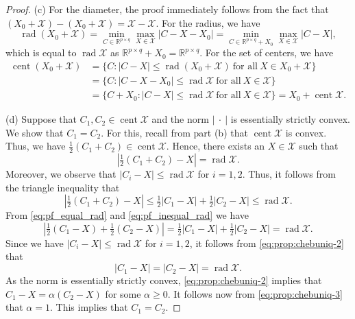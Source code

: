 \documentclass[pdflatex,sn-mathphys-num]{sn-jnl}%
\DeclareMathOperator{\rad}{rad}
\DeclareMathOperator{\cent}{cent}
\newcommand{\norm}[1]{\left|#1\right|}
\theoremstyle{thmstyleone}
\begin{document}
\begin{proof}
(c) For the diameter, the proof immediately follows from the fact that \mbox{$(X_0+\mathcal{X})-(X_0+\mathcal{X})=\mathcal{X}-\mathcal{X}$}. For the radius, we have
\begin{equation}
\rad (X_0+\mathcal{X})= \min_{C\in\mathbb{R}^{p\times q}} \max_{X\in\mathcal{X}} \norm{C-X-X_0}=\min_{C\in\mathbb{R}^{p\times q}+X_0} \max_{X\in\mathcal{X}} \norm{C-X},
\end{equation}
which is equal to $\rad \mathcal{X}$ as $\mathbb{R}^{p\times q}+X_0=\mathbb{R}^{p\times q}$. For the set of centers, we have 
\begin{equation}
\begin{split}
\cent(X_0+\mathcal{X})&=\{C:\norm{C-X}\leq\rad(X_0+\mathcal{X}) \ \text{for all}\  X\in X_0+\mathcal{X}\} \\
&= \{C:\norm{C-X-X_0}\leq\rad\mathcal{X} \ \text{for all}\  X\in\mathcal{X}\}\\
&=\{C+X_0:\norm{C-X}\leq\rad\mathcal{X} \ \text{for all}\   X\in\mathcal{X}\}=X_0+\cent\mathcal{X}.
\end{split}
\end{equation}

(d) Suppose that $C_1,C_2\in\cent\mathcal{X}$ and the norm $\norm{\ \cdot\ }$ is essentially strictly convex. We show that $C_1=C_2$. For this, recall from part (b) that $\cent\mathcal{X}$ is convex. Thus, we have $\tfrac{1}{2}(C_1+C_2)\in\cent\mathcal{X}$. Hence, there exists an $X\in\mathcal{X}$ such that
\begin{equation}
\label{eq:pf_equal_rad}
\norm{\tfrac{1}{2}(C_1+C_2)-X}=\rad\mathcal{X}.
\end{equation}
Moreover, we observe that $\norm{C_i-X}\leq\rad\mathcal{X}$ for $i=1,2$. Thus, it follows from the triangle inequality that
\begin{equation}
\label{eq:pf_inequal_rad}
\norm{\tfrac{1}{2}(C_1+C_2)-X}\leq\tfrac{1}{2}\norm{C_1-X}+\tfrac{1}{2}\norm{C_2-X}\leq\rad\mathcal{X}.
\end{equation}
From \eqref{eq:pf_equal_rad} and \eqref{eq:pf_inequal_rad} we have
\begin{equation}
\label{eq:prop:chebuniq-2}
\norm{\tfrac{1}{2}(C_1-X)+\tfrac{1}{2}(C_2-X)}=\tfrac{1}{2}\norm{C_1-X}+\tfrac{1}{2}\norm{C_2-X}=\rad\mathcal{X}.
\end{equation}
Since we have $\norm{C_i-X}\leq\rad\mathcal{X}$ for $i=1,2$, it follows from \eqref{eq:prop:chebuniq-2} that 
\begin{equation}
\label{eq:prop:chebuniq-3}
\norm{C_1-X}=\norm{C_2-X}=\rad\mathcal{X}.
\end{equation}
As the norm is essentially strictly convex, \eqref{eq:prop:chebuniq-2} implies that $C_1-X=\alpha(C_2-X)$ for some $\alpha\geq 0$. It follows now from \eqref{eq:prop:chebuniq-3} that $\alpha=1$. This implies that $C_1=C_2$.
\end{proof}
\end{document}
